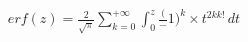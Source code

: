 \documentclass[preview]{standalone}
\begin{document}
\begin{align*}
erf(z) = { \frac{2}{\sqrt{\pi}} } \sum_{k=0}^{+\infty} \int_0^z { { \frac (-1)^k} \times t^{2k {k!} } } \, dt
\end{align*}
\end{document}
